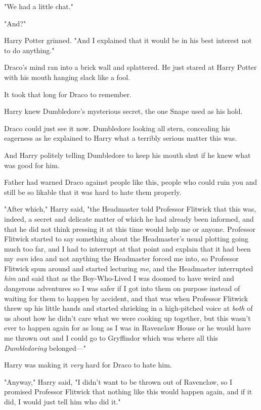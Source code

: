 "We had a little chat."

"And?"

Harry Potter grinned. "And I explained that it would be in his best interest 
not to do anything."

Draco's mind ran into a brick wall and splattered. He just stared at Harry 
Potter with his mouth hanging slack like a fool.

It took that long for Draco to remember.

Harry knew Dumbledore's mysterious secret, the one Snape used as his hold.

Draco could just see it now. Dumbledore looking all stern, concealing his 
eagerness as he explained to Harry what a terribly serious matter this was.

And Harry politely telling Dumbledore to keep his mouth shut if he knew what 
was good for him.

Father had warned Draco against people like this, people who could ruin you and 
still be so likable that it was hard to hate them properly.

"After which," Harry said, "the Headmaster told Professor Flitwick that this 
was, indeed, a secret and delicate matter of which he had already been 
informed, and that he did not think pressing it at this time would help me or 
anyone. Professor Flitwick started to say something about the Headmaster's 
usual plotting going much too far, and I had to interrupt at that point and 
explain that it had been my \emph{own} idea and not anything the Headmaster 
forced me into, so Professor Flitwick spun around and started lecturing 
\emph{me}, and the Headmaster interrupted \emph{him} and said that as the 
Boy-Who-Lived I was doomed to have weird and dangerous adventures so I was 
safer if I got into them on purpose instead of waiting for them to happen by 
accident, and that was when Professor Flitwick threw up his little hands and 
started shrieking in a high-pitched voice at \emph{both} of us about how he 
didn't care what we were cooking up together, but this wasn't ever to happen 
again for as long as I was in Ravenclaw House or he would have me thrown out 
and I could go to Gryffindor which was where all this \emph{Dumbledoring} 
belonged---"

Harry was making it \emph{very} hard for Draco to hate him.

"Anyway," Harry said, "I didn't want to be thrown out of Ravenclaw, so I 
promised Professor Flitwick that nothing like this would happen again, and if 
it did, I would just tell him who did it."

